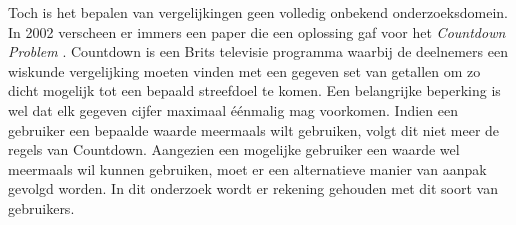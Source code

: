 \documentclass[Main.tex]{subfiles}
\begin{document}
Toch is het bepalen van vergelijkingen geen volledig onbekend onderzoeksdomein. In 2002 verscheen er immers een paper die een oplossing gaf voor het \textit{Countdown Problem} \cite{countdown}. Countdown is een Brits televisie programma waarbij de deelnemers een wiskunde vergelijking moeten vinden met een gegeven set van getallen om zo dicht mogelijk tot een bepaald streefdoel te komen. Een belangrijke beperking is wel dat elk gegeven cijfer maximaal \'e\'enmalig mag voorkomen. Indien een gebruiker een bepaalde waarde meermaals wilt gebruiken, volgt dit niet meer de regels van Countdown. Aangezien een mogelijke gebruiker een waarde wel meermaals wil kunnen gebruiken, moet er een alternatieve manier van aanpak gevolgd worden. In dit onderzoek wordt er rekening gehouden met dit soort van gebruikers.
\end{document}
